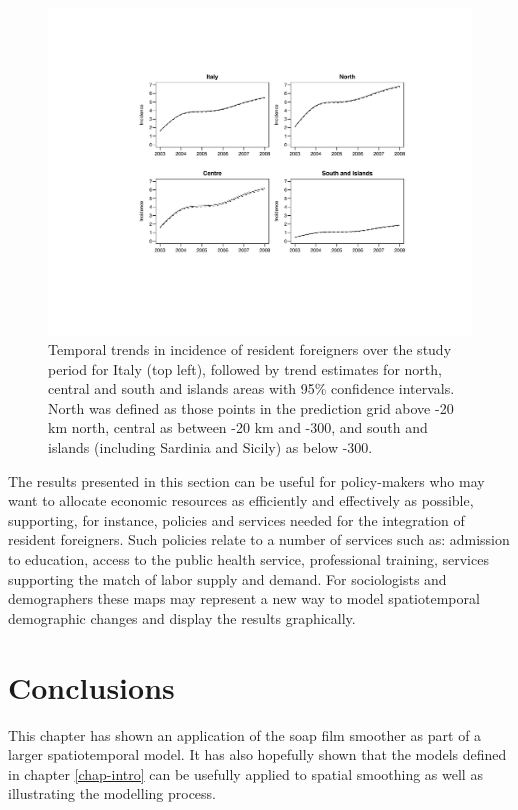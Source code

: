 \begin{figure}[t]
	\centering
		\includegraphics[width=\textwidth]{it/trends.pdf}
	\caption{Temporal trends in incidence of resident foreigners over the study period for Italy (top left), followed by trend estimates for north, central and south and islands areas with 95\% confidence intervals. North was defined as those points in the prediction grid above -20 km north, central as between -20 km and -300, and south and islands (including Sardinia and Sicily) as below -300.}
	\label{trends}
\end{figure}

The results presented in this section can be useful for policy-makers who may want to allocate economic resources as efficiently and effectively as possible, supporting, for instance, policies and services needed for the integration of resident foreigners. Such policies relate to a number of services such as: admission to education, access to the public health service, professional training, services supporting the match of labor supply and demand. For sociologists and demographers these maps may represent a new way to model spatiotemporal demographic changes and display the results graphically. 

\section{Conclusions}
\label{it-conc}

This chapter has shown an application of the soap film smoother as part of a larger spatiotemporal model. It has also hopefully shown that the models defined in chapter \ref{chap-intro} can be usefully applied to spatial smoothing as well as illustrating the modelling process.

